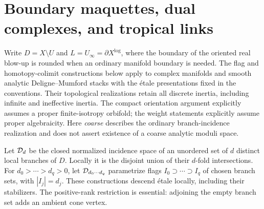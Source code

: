 \section{Boundary maquettes, dual complexes, and tropical links}
\label{sec:boundary}

Write $D=X\setminus U$ and $L=U_\infty=\partial X^{\log}$, where the boundary of the oriented real blow-up is rounded when an ordinary manifold boundary is needed. The flag and homotopy-colimit constructions below apply to complex manifolds and smooth analytic Deligne--Mumford stacks with the étale presentations fixed in the conventions. Their topological realizations retain all discrete inertia, including infinite and ineffective inertia. The compact orientation argument explicitly assumes a proper finite-isotropy orbifold; the weight statements explicitly assume proper algebraicity. Here \emph{coarse} describes the ordinary branch-incidence realization and does not assert existence of a coarse analytic moduli space.

Let $\mathcal D_d$ be the closed normalized incidence space of an unordered set of $d$ distinct local branches of $D$. Locally it is the disjoint union of their $d$-fold intersections. For $d_0>\cdots>d_q>0$, let $\mathcal D_{d_0\cdots d_q}$ parametrize flags $I_0\supset\cdots\supset I_q$ of chosen branch sets, with $|I_j|=d_j$. These constructions descend étale locally, including their stabilizers. The positive-rank restriction is essential: adjoining the empty branch set adds an ambient cone vertex.

